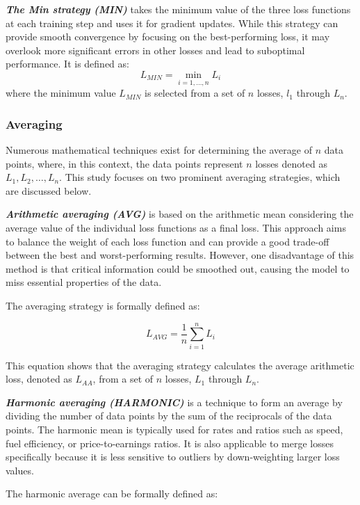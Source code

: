 \textbf{\emph{The Min strategy (MIN)}} takes the minimum value of the three loss functions at each training step and uses it for gradient updates. While this strategy can provide smooth convergence by focusing on the best-performing loss, it may overlook more significant errors in other losses and lead to suboptimal performance. It is defined as:
\begin{equation}
  L_{MIN} = \min_{i=1,\dots,n} L_i
\end{equation}
where the minimum value $L_{MIN}$ is selected from a set of $n$ losses, $l_1$ through $L_n$.
\subsubsection*{Averaging}
Numerous mathematical techniques exist for determining the average of $n$ data points, where, in this context, the data points represent $n$ losses denoted as $L_1, L_2, \dots, L_n$. This study focuses on two prominent averaging strategies, which are discussed below.

\textbf{\emph{Arithmetic averaging (AVG)}} is based on the arithmetic mean considering the average value of the individual loss functions as a final loss. This approach aims to balance the weight of each loss function and can provide a good trade-off between the best and worst-performing results. However, one disadvantage of this method is that critical information could be smoothed out, causing the model to miss essential properties of the data.

The averaging strategy is formally defined as:

\begin{equation}
  L_{AVG} = \frac{1}{n} \sum_{i=1}^{n} L_i
\end{equation}

This equation shows that the averaging strategy calculates the average arithmetic loss, denoted as $L_{AA}$, from a set of $n$ losses, $L_1$ through $L_n$.

\textbf{\emph{Harmonic averaging (HARMONIC)}} is a technique to form an average by dividing the number of data points by the sum of the reciprocals of the data points. The harmonic mean is typically used for rates and ratios such as speed, fuel efficiency, or price-to-earnings ratios. It is also applicable to merge losses specifically because it is less sensitive to outliers by down-weighting larger loss values.

The harmonic average can be formally defined as:

